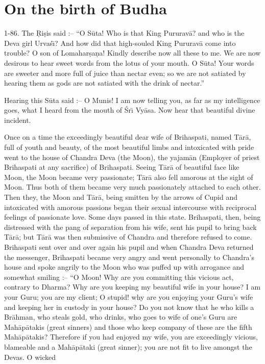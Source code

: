 \chapter{On the birth of Budha}

1-86. The \d{R}i\d{s}is said :-- ``O S\=uta! Who is that King Pururav\=a? and who is the Deva girl Urva\'s\={\i}? And how did that high-souled King Pururav\=a come into trouble? O son of Lomahar\d{s}a\d{n}a! Kindly describe now all these to me. We are now desirous to hear sweet words from the lotus of your mouth. O S\=uta! Your words are sweeter and more full of juice than nectar even; so we are not satiated by hearing them as gods are not satiated with the drink of nectar.''

Hearing this S\=uta said :-- O Munis! I am now telling you, as far as my intelligence goes, what I heard from the mouth of \'Sr\={\i} Vy\=asa. Now hear that beautiful divine incident.

Once on a time the exceedingly beautiful dear wife of Brihaspati, named T\=ar\=a, full of youth and beauty, of the most beautiful limbs and intoxicated with pride went to the house of Chandra Deva (the Moon), the yajam\=an (Employer of priest Brihaspati at any sacrifice) of Brihaspati. Seeing T\=ar\=a of beautiful face like Moon, the Moon became very passionate; T\=ar\=a also fell amorous at the sight of Moon. Thus both of them became very much passionately attached to each other. Then they, the Moon and T\=ar\=a, being smitten by the arrows of Cupid and intoxicated with amorous passions began their sexual intercourse with reciprocal feelings of passionate love. Some days passed in this state. Brihaspati, then, being distressed with the pang of separation from his wife, sent his pupil to bring back T\=ar\=a; but T\=ar\=a was then submissive of Chandra and therefore refused to come. Brihaspati sent over and over again his pupil and when Chandra Deva returned the messenger, Brihaspati became very angry and went personally to Chandra's house and spoke angrily to the Moon who was puffed up with arrogance and somewhat smiling :-- ``O Moon! Why are you committing this vicious act, contrary to Dharma? Why are you keeping my beautiful wife in your house? I am your Guru; you are my client; O stupid! why are you enjoying your Guru's wife and keeping her in custody in your house? Do you not know that he who kills a Br\=ahman, who steals gold, who drinks, who goes to wife of one's Guru are Mah\=ap\=atakis (great sinners) and those who keep company of these are the fifth Mah\=ap\=atakis? Therefore if you had enjoyed my wife, you are exceedingly vicious, blameable and a Mah\=ap\=ataki (great sinner); you are not fit to live amongst the Devas. O wicked

